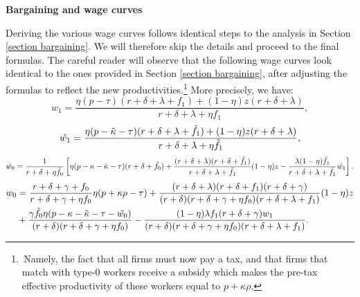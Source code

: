 \documentclass[12pt]{article} %
\theoremstyle{definition}
\begin{document}
\begin{appendix}
\medskip 

\noindent \textbf{Bargaining and wage curves}

\medskip 

\noindent Deriving the various wage curves follows identical steps to the analysis in Section \ref{section bargaining}. We will therefore skip the details and proceed to the final formulas. The careful reader will observe that the following wage curves look identical to the ones provided in Section \ref{section bargaining}, after adjusting the formulas to reflect the new productivities.\footnote{\,Namely, the fact that all firms must now pay a tax, and that firms that match with type-0 workers receive a subsidy which makes the pre-tax effective productivity of these workers equal to $p+\kappa \rho$.} More precisely, we have:    
\begin{equation*}
w_1 = \frac{\eta (p-\tau) (r+\delta+\lambda+f_1)+(1-\eta)z(r+\delta+\lambda)}{r+\delta+\lambda + \eta f_1},  
\end{equation*}
\begin{equation*}
\Tilde{w_1} = \frac{\eta (p-\Tilde{\kappa}-\tau) (r+\delta+\lambda+\tilde{f_1})+(1-\eta)z(r+\delta+\lambda)}{r+\delta+\lambda + \eta \tilde{f_1}},  
\end{equation*}
\begin{equation*} 
\Tilde{w_0} = \frac{1}{r+\delta+\eta \Tilde{f_0}}\left[\eta(p-\kappa-\Tilde{\kappa}-\tau)(r+\delta+ \Tilde{f_0})+\frac{(r+\delta+\lambda)(r+\delta+\Tilde{f_1})}{r+\delta+\lambda+\Tilde{f_1}}(1-\eta)z - \frac{\lambda(1-\eta)\Tilde{f_1}}{r+\delta+\lambda+\Tilde{f_1}}\Tilde{w_1} \right].
\end{equation*}
\begin{equation*}
\begin{split}
w_0 & = \frac{r+\delta+\gamma +f_0}{r+\delta+\gamma+\eta f_0}\eta (p+\kappa \rho -\tau) + \frac{(r+\delta +\lambda)(r+\delta+f_1)(r+\delta+\gamma)}{(r+\delta)(r+\delta+\gamma + \eta f_0)(r+\delta+\lambda+f_1)} (1-\eta) z  \\  
& + \frac{\gamma \Tilde{f_0}\eta(p-\kappa-\Tilde{\kappa}-\tau -\Tilde{w_0})}{(r+\delta)(r+\delta+\gamma + \eta f_0)} - \frac{(1-\eta)\lambda f_1 (r+\delta+\gamma)w_1}{(r+\delta)(r+\delta+\gamma + \eta f_0)(r+\delta+\lambda+f_1)}. 
\end{split}
\end{equation*}


\end{appendix}
\end{document}
